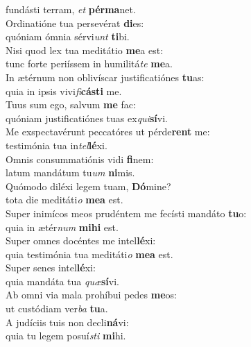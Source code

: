 \evenverse fundásti terram, \textit{et} \textbf{pér}\textbf{ma}net.\\
\oddverse Ordinatióne tua persevérat \textbf{di}es:~\*\\
\oddverse quóniam ómnia sérvi\textit{unt} \textbf{ti}bi.\\
\evenverse Nisi quod lex tua meditátio \textbf{me}a est:~\*\\
\evenverse tunc forte periíssem in humilitá\textit{te} \textbf{me}a.\\
\oddverse In ætérnum non oblivíscar justificatiónes \textbf{tu}as:~\*\\
\oddverse quia in ipsis vivi\textit{fi}\textbf{cá}\textbf{sti} me.\\
\evenverse Tuus sum ego, salvum \textbf{me} fac:~\*\\
\evenverse quóniam justificatiónes tuas ex\textit{qui}\textbf{sí}vi.\\
\oddverse Me exspectavérunt peccatóres ut pérde\textbf{rent} me:~\*\\
\oddverse testimónia tua in\textit{tel}\textbf{lé}xi.\\
\evenverse Omnis consummatiónis vidi \textbf{fi}nem:~\*\\
\evenverse latum mandátum tu\textit{um} \textbf{ni}mis.\\
\oddverse Quómodo diléxi legem tuam, \textbf{Dó}mine?~\*\\
\oddverse tota die meditáti\textit{o} \textbf{me}\textbf{a} est.\\
\evenverse Super inimícos meos prudéntem me fecísti mandáto \textbf{tu}o:~\*\\
\evenverse quia in ætér\textit{num} \textbf{mi}\textbf{hi} est.\\
\oddverse Super omnes docéntes me intel\textbf{lé}xi:~\*\\
\oddverse quia testimónia tua meditáti\textit{o} \textbf{me}\textbf{a} est.\\
\evenverse Super senes intel\textbf{lé}xi:~\*\\
\evenverse quia mandáta tua \textit{quæ}\textbf{sí}vi.\\
\oddverse Ab omni via mala prohíbui pedes \textbf{me}os:~\*\\
\oddverse ut custódiam ver\textit{ba} \textbf{tu}a.\\
\evenverse A judíciis tuis non decli\textbf{ná}vi:~\*\\
\evenverse quia tu legem posuí\textit{sti} \textbf{mi}hi.\\
